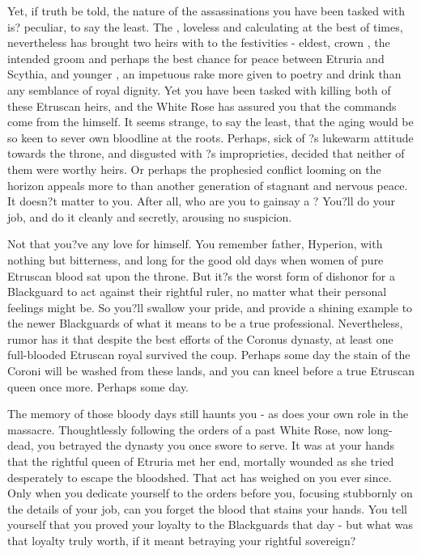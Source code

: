 \documentclass[char]{Kos}
\begin{document}
    Yet, if truth be told, the nature of the assassinations you have been tasked with is? peculiar, to say the least. The \cEtruriaKing{\monarch}, loveless and calculating at the best of times, nevertheless has brought \cEtruriaKing{\their} two heirs with \cEtruriaKing{\them} to the festivities - \cEtruriaKing{\their} eldest, crown \cGroom{\Prince} \cGroom{}, the intended groom and perhaps the best chance for peace between Etruria and Scythia, and \cEtruriaKing{\their} younger \cPoet{\offspring} \cPoet{}, an impetuous rake more given to poetry and drink than any semblance of royal dignity. Yet you have been tasked with killing both of these Etruscan heirs, and the White Rose has assured you that the commands come from the \cEtruriaKing{\monarch} himself. It seems strange, to say the least, that the aging \cEtruriaKing{} would be so keen to sever \cEtruriaKing{\their} own bloodline at the roots. Perhaps, sick of \cGroom{}?s lukewarm attitude towards the throne, and disgusted with \cPoet{}?s improprieties, \cEtruriaKing{\they} decided that neither of them were worthy heirs. Or perhaps the prophesied conflict looming on the horizon appeals more to \cEtruriaKing{} than another generation of stagnant and nervous peace. It doesn?t matter to you. After all, who are you to gainsay a \cEtruriaKing{\monarch}? You?ll do your job, and do it cleanly and secretly, arousing no suspicion. 

    Not that you?ve any love for \cEtruriaKing{} himself. You remember \cEtruriaKing{\their} father, Hyperion, with nothing but bitterness, and long for the good old days when women of pure Etruscan blood sat upon the throne. But it?s the worst form of dishonor for a Blackguard to act against their rightful ruler, no matter what their personal feelings might be. So you?ll swallow your pride, and provide a shining example to the newer Blackguards of what it means to be a true professional. Nevertheless, rumor has it that despite the best efforts of the Coronus dynasty, at least one full-blooded Etruscan royal survived the coup. Perhaps some day the stain of the Coroni will be washed from these lands, and you can kneel before a true Etruscan queen once more. Perhaps some day.

The memory of those bloody days still haunts you - as does your own role in the massacre. Thoughtlessly following the orders of a past White Rose, now long-dead, you betrayed the dynasty you once swore to serve. It was at your hands that the rightful queen of Etruria met her end, mortally wounded as she tried desperately to escape the bloodshed. That act has weighed on you ever since. Only when you dedicate yourself to the orders before you, focusing stubbornly on the details of your job, can you forget the blood that stains your hands. You tell yourself that you proved your loyalty to the Blackguards that day - but what was that loyalty truly worth, if it meant betraying your rightful sovereign?
\end{document}
